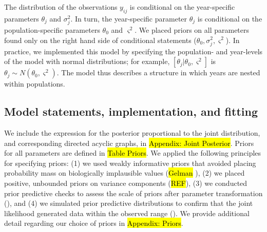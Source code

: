 \documentclass[12pt, oneside, titlepage]{article}   	%
\begin{document}
{

The distribution of the observations $y_{ij}$ is conditional on the year-specific parameters $\theta_j$ and $\sigma^2_j$. In turn, the year-specific parameter $\theta_j$ is conditional on the population-specific parameters $\theta_0$ and $ \varsigma^2$. We placed priors on all parameters found only on the right hand side of conditional statements ($\theta_0, \sigma^2_j, \varsigma^2$). In practice, we implemented this model by specifying the population- and year-levels of the model with normal distributions; for example, $[ \theta_j | \theta_0 , \varsigma^2 ]$ is $\theta_j \sim N(\theta_0, \varsigma^2)$. The model thus describes a structure in which years are nested within populations.

\subsection{Model statements, implementation, and fitting}

We include the expression for the posterior proportional to the joint distribution, and corresponding directed acyclic graphs, in \hl{Appendix: Joint Posterior}. Priors for all parameters are defined in \hl{Table Priors}. We applied the following principles for specifying priors: (1) we used weakly informative priors that avoided placing probability mass on biologically implausible values (\hl{Gelman} \cite{lemoine2019,wesner2020}), (2) we placed positive, unbounded priors on variance components (\hl{REF}), (3) we conducted prior predictive checks to assess the scale of priors after parameter transformation (\cite{hobbs2015b,gabry2019,wesner2020}), and (4) we simulated prior predictive distributions to confirm that the joint likelihood generated data within the observed range (\cite{gabry2019,conn2018,hobbs2015b}). We provide additional detail regarding our choice of priors in \hl{Appendix: Priors}. 

}
\end{document}
